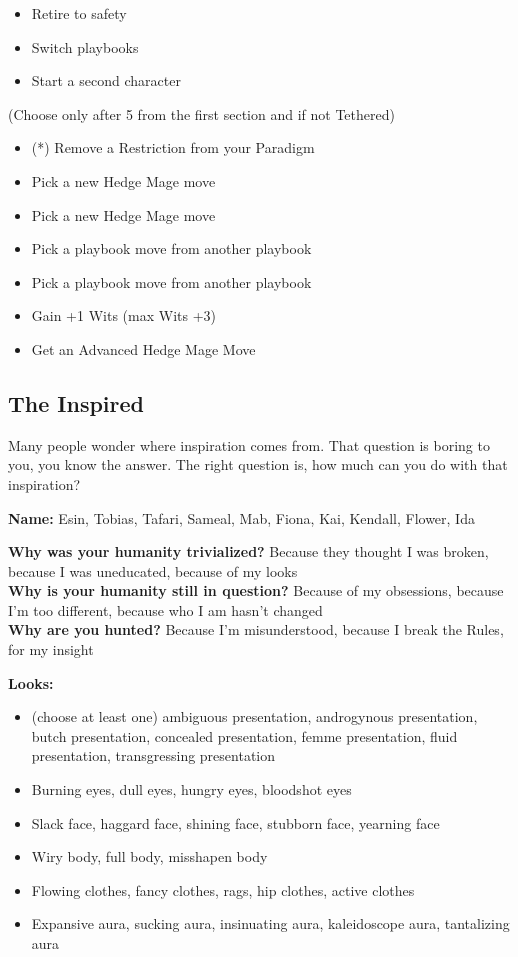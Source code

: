 \documentclass[
]{article}
\providecommand{\tightlist}{%
  \setlength{\itemsep}{0pt}\setlength{\parskip}{0pt}}
\begin{document}
\begin{itemize}
\tightlist
\item
  Retire to safety
\item
  Switch playbooks
\item
  Start a second character
\end{itemize}

(Choose only after 5 from the first section and if not Tethered)

\begin{itemize}
\tightlist
\item
  (*) Remove a Restriction from your Paradigm
\item
  Pick a new Hedge Mage move
\item
  Pick a new Hedge Mage move
\item
  Pick a playbook move from another playbook
\item
  Pick a playbook move from another playbook
\item
  Gain +1 Wits (max Wits +3)
\item
  Get an Advanced Hedge Mage Move
\end{itemize}

\newpage

\hypertarget{the-inspired}{%
\subsection{The Inspired}\label{the-inspired}}

Many people wonder where inspiration comes from. That question is boring
to you, you know the answer. The right question is, how much can you do
with that inspiration?

\textbf{Name:} Esin, Tobias, Tafari, Sameal, Mab, Fiona, Kai, Kendall,
Flower, Ida

\textbf{Why was your humanity trivialized?} Because they thought I was
broken, because I was uneducated, because of my looks\\
\textbf{Why is your humanity still in question?} Because of my
obsessions, because I'm too different, because who I am hasn't changed\\
\textbf{Why are you hunted?} Because I'm misunderstood, because I break
the Rules, for my insight

\textbf{Looks:}

\begin{itemize}
\tightlist
\item
  (choose at least one) ambiguous presentation, androgynous
  presentation, butch presentation, concealed presentation, femme
  presentation, fluid presentation, transgressing presentation
\item
  Burning eyes, dull eyes, hungry eyes, bloodshot eyes
\item
  Slack face, haggard face, shining face, stubborn face, yearning face
\item
  Wiry body, full body, misshapen body
\item
  Flowing clothes, fancy clothes, rags, hip clothes, active clothes
\item
  Expansive aura, sucking aura, insinuating aura, kaleidoscope aura,
  tantalizing aura
\end{itemize}
\end{document}
